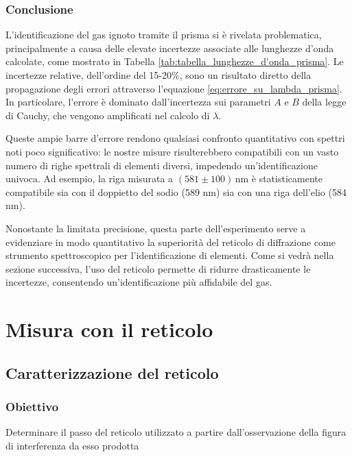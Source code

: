 \documentclass[a4paper]{article}
\begin{document}
\subsubsection{Conclusione}
L'identificazione del gas ignoto tramite il prisma si è rivelata problematica, principalmente a causa delle elevate incertezze associate alle lunghezze d'onda calcolate, come mostrato in Tabella \ref{tab:tabella_lunghezze_d'onda_prisma}. Le incertezze relative, dell'ordine del 15-20\%, sono un risultato diretto della propagazione degli errori attraverso l'equazione \ref{eq:errore_su_lambda_prisma}. In particolare, l'errore è dominato dall'incertezza sui parametri $A$ e $B$ della legge di Cauchy, che vengono amplificati nel calcolo di $\lambda$.

Queste ampie barre d'errore rendono qualsiasi confronto quantitativo con spettri noti poco significativo: le nostre misure risulterebbero compatibili con un vasto numero di righe spettrali di elementi diversi, impedendo un'identificazione univoca. Ad esempio, la riga misurata a $(581 \pm 100)\,$nm è statisticamente compatibile sia con il doppietto del sodio (589 nm) sia con una riga dell'elio (584 nm).

Nonostante la limitata precisione, questa parte dell'esperimento serve a evidenziare in modo quantitativo la superiorità del reticolo di diffrazione come strumento spettroscopico per l'identificazione di elementi. Come si vedrà nella sezione successiva, l'uso del reticolo permette di ridurre drasticamente le incertezze, consentendo un'identificazione più affidabile del gas.

\section{Misura con il reticolo}

\subsection{Caratterizzazione del reticolo}
\subsubsection{Obiettivo}
Determinare il passo del reticolo utilizzato a partire dall'osservazione della figura di interferenza da esso prodotta
\end{document}
